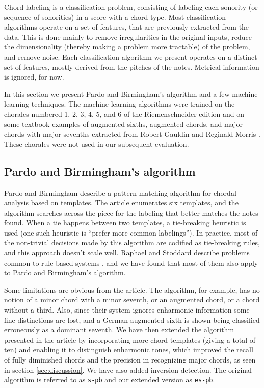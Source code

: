 \documentclass{article}
\begin{document}
Chord labeling is a classification problem, consisting of labeling
each sonority (or sequence of sonorities) in a score with a chord
type. Most classification algorithms operate on a set of features,
that are previously extracted from the data. This is done mainly to
remove irregularities in the original inputs, reduce the
dimensionality (thereby making a problem more tractable) of the
problem, and remove noise. Each classification algorithm we present
operates on a distinct set of features, mostly derived from the
pitches of the notes. Metrical information is ignored, for now.

In this section we present Pardo and Birmingham's algorithm and a few
machine learning techniques. The machine learning algorithms were
trained on the chorales numbered 1, 2, 3, 4, 5, and 6 of the
Riemenschneider edition and on some textbook examples of augmented
sixths, augmented chords, and major chords with major sevenths
extracted from Robert Gauldin \cite{gauldin05:harmonic} and Reginald
Morris \cite{morris33:figured}. These chorales were not used in our
subsequent evaluation.

\subsection{Pardo and Birmingham's algorithm}
\label{sec:pardo}


Pardo and Birmingham \cite{barthelemy.ea01:figured} describe a
pattern-matching algorithm for chordal analysis based on templates.
The article enumerates six templates, and the algorithm searches
across the piece for the labeling that better matches the notes found.
When a tie happens between two templates, a tie-breaking heuristic is
used (one such heuristic is ``prefer more common labelings''). In
practice, most of the non-trivial decisions made by this algorithm are
codified as tie-breaking rules, and this approach doesn't scale
well. Raphael and Stoddard describe problems common to rule based
systems \cite{raphael.ea03:harmonic}, and we have found that most of
them also apply to Pardo and Birmingham's algorithm.

Some limitations are obvious from the article. The algorithm, for
example, has no notion of a minor chord with a minor seventh, or an
augmented chord, or a chord without a third. Also, since their system
ignores enharmonic information some fine distinctions are lost, and a
German augmented sixth is shown being classified erroneously as a
dominant seventh. We have then extended the algorithm presented in the
article by incorporating more chord templates (giving a total of ten)
and enabling it to distinguish enharmonic tones, which improved the
recall of fully diminished chords and the precision in recognizing
major chords, as seen in section \ref{sec:discussion}. We have also
added inversion detection. The original algorithm is referred to as
\texttt{s-pb} and our extended version as \texttt{es-pb}.
\end{document}
